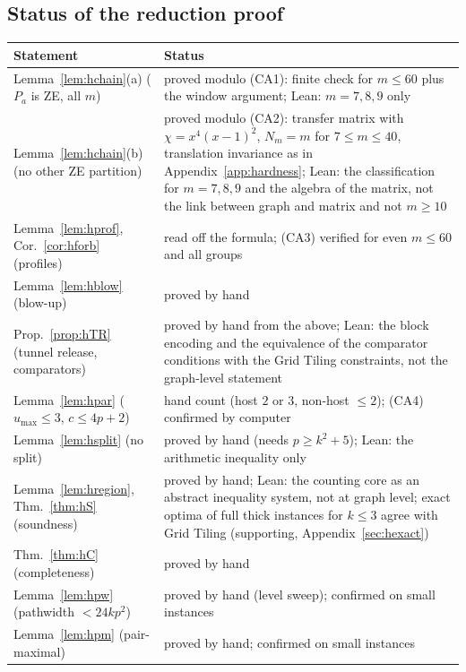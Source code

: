 \subsection{Status of the reduction proof}\label{sec:hstatus}
\begin{center}
\small
\begin{tabular}{@{}p{}p{}@{}}
\hline
Statement & Status\\\hline
Lemma~\ref{lem:hchain}(a) ($P_a$ is ZE, all $m$) & proved modulo (CA1): finite check for $m\le60$ plus the window argument; Lean: $m=7,8,9$ only\\
Lemma~\ref{lem:hchain}(b) (no other ZE partition) & proved modulo (CA2): transfer matrix with $\chi=x^4(x-1)^2$, $N_m=m$ for $7\le m\le40$, translation invariance as in Appendix~\ref{app:hardness}; Lean: the classification for $m=7,8,9$ and the algebra of the matrix, not the link between graph and matrix and not $m\ge10$\\
Lemma~\ref{lem:hprof}, Cor.~\ref{cor:hforb} (profiles) & read off the formula; (CA3) verified for even $m\le60$ and all groups\\
Lemma~\ref{lem:hblow} (blow-up) & proved by hand\\
Prop.~\ref{prop:hTR} (tunnel release, comparators) & proved by hand from the above; Lean: the block encoding and the equivalence of the comparator conditions with the Grid Tiling constraints, not the graph-level statement\\
Lemma~\ref{lem:hpar} ($u_{\max}\le3$, $c\le4p+2$) & hand count (host $2$ or $3$, non-host $\le2$); (CA4) confirmed by computer\\
Lemma~\ref{lem:hsplit} (no split) & proved by hand (needs $p\ge k^2+5$); Lean: the arithmetic inequality only\\
Lemma~\ref{lem:hregion}, Thm.~\ref{thm:hS} (soundness) & proved by hand; Lean: the counting core as an abstract inequality system, not at graph level; exact optima of full thick instances for $k\le3$ agree with Grid Tiling (supporting, Appendix~\ref{sec:hexact})\\
Thm.~\ref{thm:hC} (completeness) & proved by hand\\
Lemma~\ref{lem:hpw} (pathwidth $<24kp^2$) & proved by hand (level sweep); confirmed on small instances\\
Lemma~\ref{lem:hpm} (pair-maximal) & proved by hand; confirmed on small instances\\\hline
\end{tabular}
\end{center}

